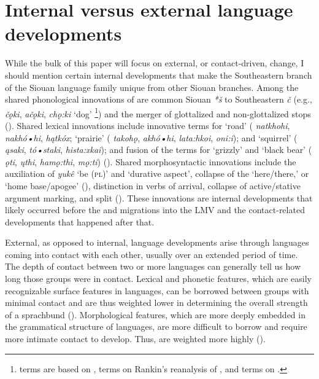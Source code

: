 \documentclass[output=paper]{LSP/langsci}
\begin{document}
\section{Internal versus external language developments}

While the bulk of this paper will focus on external, or contact-driven, change, I should mention certain internal developments that make the Southeastern branch of the Siouan language family unique from other Siouan branches. Among the shared phonological innovations of  are common Siouan \emph{*š} to Southeastern \emph{č} (e.g.,  \emph{čǫki},  \emph{ačǫki},  \emph{chǫ:ki} `dog' \footnote{ terms are based on \citet{DorseySwanton1912},  terms on Rankin’s reanalysis \citeyearpar{Rankin2002} of \citet{DorseySwanton1912}, and  terms on \citet{Oliverio1996}.}) and the merger of glottalized and non-glottalized stops (\citealt{Rankin2011}). Shared lexical innovations include innovative terms for `road' ( \emph{natkhohi},  \emph{nakhó•hi},  \emph{hątkóx}; `prairie' ( \emph{takohǫ},  \emph{akhó•hi},  \emph{lata:hkoi}, \emph{oni:i}); and `squirrel' ( \emph{ąsaki},  \emph{tó•staki},  \emph{hista:xkai}); and fusion of the terms for `grizzly' and `black bear' ( \emph{ǫti},  \emph{ųthi},  \emph{hamǫ:thi}, \emph{mǫ:ti}) (\citealt{Rankin2011}). Shared morphosyntactic innovations include the auxiliation of \emph{yukê} `be (\textsc{pl})' and `durative aspect', collapse of the `here/there,' or `home base/apogee' (\citealt[125]{Cumberland2005}), distinction in verbs of arrival, collapse of active/stative argument marking, and split  (\citealt{Cumberland2005}). These innovations are internal developments that likely occurred before the  and  migrations into the LMV and the contact-related developments that happened after that.

External, as opposed to internal, language developments arise through languages coming into contact with each other, usually over an extended period of time. The depth of contact between two or more languages can generally tell us how long those groups were in contact. Lexical and phonetic features, which are easily recognizable surface features in languages, can be borrowed between groups with minimal contact and are thus weighted lower in determining the overall strength of a sprachbund (\citealt{Kaufman2014}). Morphological features, which are more deeply embedded in the grammatical structure of languages, are more difficult to borrow and require more intimate contact to develop. Thus,  are weighted more highly (\citealt{Kaufman2014}).
\end{document}
